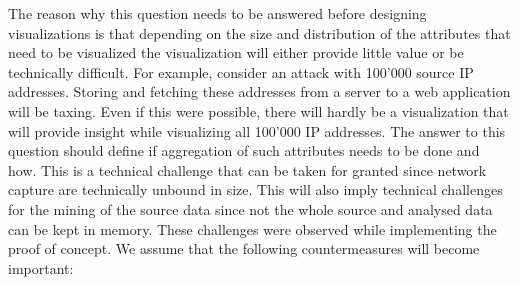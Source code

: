     The reason why this question needs to be answered before designing visualizations is that depending on the size and distribution of the attributes that need to be visualized the visualization will either provide little value or be technically difficult. For example, consider an attack with 100'000 source IP addresses. Storing and fetching these addresses from a server to a web application will be taxing. Even if this were possible, there will hardly be a visualization that will provide insight while visualizing all 100'000 IP addresses. The answer to this question should define if aggregation of such attributes needs to be done and how.
    This is a technical challenge that can be taken for granted since network capture are technically unbound in size. This will also imply technical challenges for the mining of the source data since not the whole source and analysed data can be kept in memory.
    These challenges were observed while implementing the proof of concept. We assume that the following countermeasures will become important:

